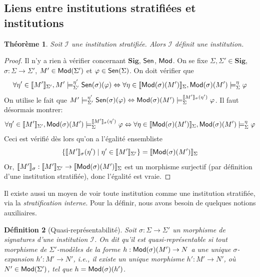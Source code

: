 \documentclass[11pt,a4paper]{report}
\newtheorem{theo}{Théorème}
\newtheorem{defi}[theo]{Définition}
\newcommand{\ph}{\varphi}
\newcommand{\gr}{\textbf}
\newcommand{\il}{\textit}
\newcommand{\I}{\mathcal{I}}
\renewcommand{\iff}{\Leftrightarrow}
\newcommand{\lb}{\llbracket}
\newcommand{\rb}{\rrbracket}
\newcommand{\info}[1]{\text{{\fontfamily{lmss}\selectfont #1}}}
\newcommand{\Mod}{\info{Mod}}
\newcommand{\Sen}{\info{Sen}}
\newcommand{\1}{\mathbbm{1}}
\begin{document}
\subsection{Liens entre institutions stratifiées et institutions}
\begin{theo}
Soit $\I$ une institution stratifiée. Alors $\I$ définit une institution.
\end{theo} 
\begin{proof}
Il n'y a rien à vérifier concernant $\gr{Sig}$, $\Sen$, $\Mod$. On se fixe $\Sigma,\Sigma' \in \gr{Sig}$, $\sigma : \Sigma \to \Sigma'$, $M' \in \Mod(\Sigma')$ et $\ph \in \Sen(\Sigma)$. On doit vérifier que
\[ \forall \eta' \in \lb M' \rb_{\Sigma'}, M' \models^{\eta'}_{\Sigma'} \Sen(\sigma)(\ph) \iff \forall \eta \in \lb \Mod(\sigma)(M') \rb_\Sigma, \Mod(\sigma)(M') \models^\eta_\Sigma \ph \] 
On utilise le fait que $M' \models_{\Sigma'}^{\eta'} \Sen(\sigma)(\ph) \iff \Mod(\sigma)(M') \models_\Sigma^{\lb M' \rb_\sigma (\eta')} \ph$. Il faut désormais montrer:
\[ \forall \eta' \in \lb M' \rb_{\Sigma'}, \Mod(\sigma)(M') \models_\Sigma^{\lb M' \rb_\sigma (\eta')} \ph \iff \forall \eta \in \lb \Mod(\sigma)(M') \rb_\Sigma, \Mod(\sigma)(M') \models^\eta_\Sigma \ph \]
Ceci est vérifié dès lors qu'on a l'égalité ensembliste 
\[ \{ \lb M' \rb_\sigma(\eta') \mid \eta' \in \lb M' \rb_{\Sigma'} \} = \lb \Mod(\sigma)(M') \rb_\Sigma \] Or, $\lb M' \rb_\sigma : \lb M' \rb_{\Sigma'} \to \lb \Mod(\sigma)(M') \rb_\Sigma$ est un morphisme surjectif (par définition d'une institution stratifiée), donc l'égalité est vraie.
\end{proof}
Il existe aussi un moyen de voir toute institution comme une institution stratifiée, via la \il{stratification interne}. Pour la définir, nous avons besoin de quelques notions auxiliaires.
\begin{defi}[Quasi-représentabilité]
Soit $\sigma : \Sigma \to \Sigma'$ un morphisme de signatures d'une institution $\I$. On dit qu'il est \il{quasi-représentable} si tout morphisme de $\Sigma'$-modèles de la forme $h : \Mod(\sigma)(M') \to N$ a une unique $\sigma$-expansion $h' : M' \to N'$, i.e., il existe un unique morphisme $h' : M' \to N'$, où $N' \in \Mod(\Sigma')$, tel que $h = \Mod(\sigma)(h')$. 
\end{defi}
\end{document}
